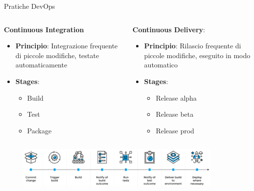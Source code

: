 \begin{frame}{Pratiche DevOps}
    \begin{columns}[onlytextwidth,t]
        \begin{column}{0.45\textwidth}
    
            \textbf{Continuous Integration}
            \vspace{2mm}
            \begin{itemize}
                \item \textbf{Principio}: Integrazione frequente di piccole modifiche, testate automaticamente
                \vspace{2mm}
                \item \textbf{Stages}:
                \begin{itemize}
                    \item Build
                    \item Test
                    \item Package
                \end{itemize}
            \end{itemize}
            
        \end{column}
        \begin{column}{0.45\textwidth}

            \textbf{Continuous Delivery}:
            \vspace{2mm}
            \begin{itemize}
                \item \textbf{Principio}: Rilascio frequente di piccole modifiche, eseguito in modo automatico
                \vspace{2mm}
                \item \textbf{Stages}:
                \begin{itemize}
                    \item Release alpha
                    \item Release beta
                    \item Release prod
                \end{itemize}
            \end{itemize}
        
        \end{column}
    \end{columns}

    \vspace{2mm}

    \begin{figure}[H]
        \includegraphics[width=0.9\textwidth]{img/cicd.png}
    \end{figure}

\end{frame}

